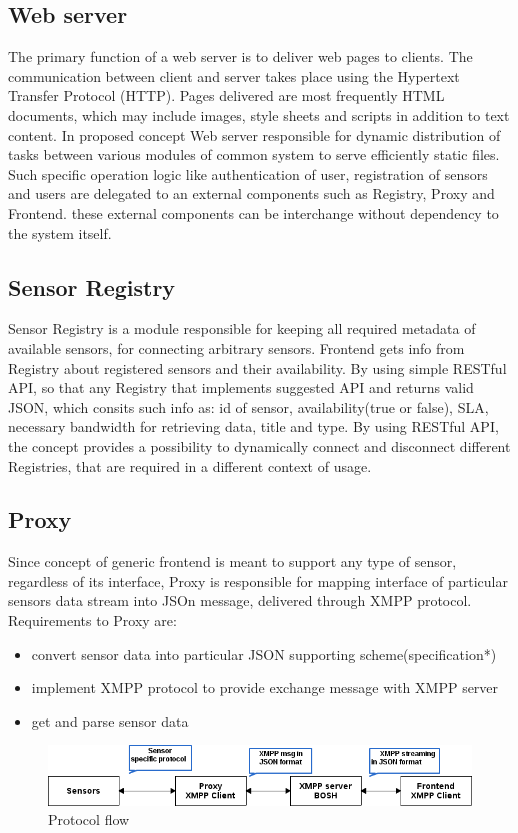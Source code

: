 	\subsection{Web server}
  The primary function of a web server is to deliver web pages to clients. The communication between client and server takes place using the Hypertext Transfer Protocol (HTTP). Pages delivered are most frequently HTML documents, which may include images, style sheets and scripts in addition to text content. 
  \newline In proposed concept Web server responsible for dynamic distribution of tasks between various modules of common system to serve efficiently static files. Such specific operation logic like authentication of user, registration of sensors and users are delegated to an external components such as Registry, Proxy and Frontend. these external components can be interchange without dependency to the system itself.

	\subsection{Sensor Registry}
  Sensor Registry is a module responsible for keeping all required metadata of available sensors, for connecting arbitrary sensors. Frontend gets info from Registry about registered sensors and their availability. By using simple RESTful API, so that any Registry that implements suggested API and returns valid JSON, which consits such info as: id of sensor, availability(true or false), SLA, necessary bandwidth for retrieving data, title and type. By using RESTful API, the concept provides a possibility to dynamically connect and disconnect different Registries, that are required in a different context of usage. 

	\subsection{Proxy}
  Since concept of generic frontend is meant to support any type of sensor, regardless of its interface, Proxy is responsible for mapping interface of particular sensors data stream into JSOn message, delivered through XMPP protocol. Requirements to Proxy are:
  \begin{itemize}
  \item convert sensor data into particular JSON supporting scheme(specification*)
  \item implement XMPP protocol to provide exchange message with XMPP server
  \item get and parse sensor data
  \end{itemize}
    \begin{figure}[!ht]
    \centering
    \includegraphics[scale=0.6]{images/Protocol_flow.png}   
    \caption[Protocol flow]{Protocol flow}
    \label{img:protocol}                           
    \end{figure}

